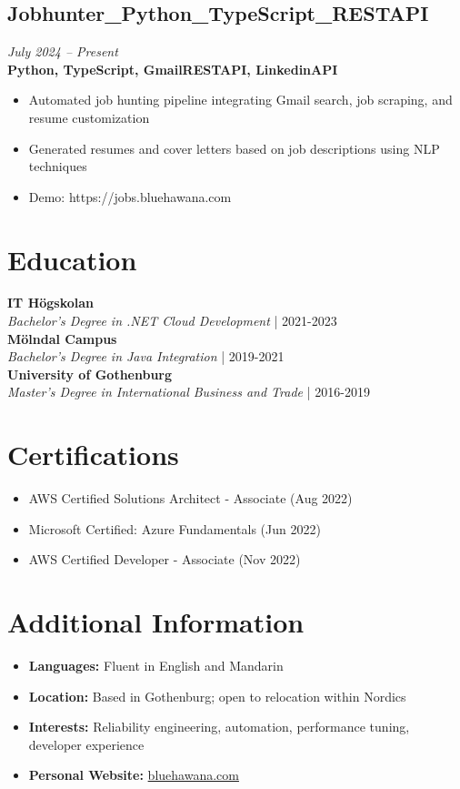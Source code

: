 \documentclass[11pt,a4paper]{article}
\begin{document}
\subsection{Jobhunter\_Python\_TypeScript\_RESTAPI}
\textit{July 2024 -- Present} \\
\textbf{Python, TypeScript, GmailRESTAPI, LinkedinAPI}
\begin{itemize}
\item Automated job hunting pipeline integrating Gmail search, job scraping, and resume customization
\item Generated resumes and cover letters based on job descriptions using NLP techniques
\item Demo: https://jobs.bluehawana.com
\end{itemize}


\section*{Education}
\textbf{IT Högskolan}\\
\textit{Bachelor's Degree in .NET Cloud Development} | 2021-2023\\
\textbf{Mölndal Campus}\\
\textit{Bachelor's Degree in Java Integration} | 2019-2021\\
\textbf{University of Gothenburg}\\
\textit{Master's Degree in International Business and Trade} | 2016-2019\\

\section*{Certifications}
\begin{itemize}
\item AWS Certified Solutions Architect - Associate (Aug 2022)
\item Microsoft Certified: Azure Fundamentals (Jun 2022)
\item AWS Certified Developer - Associate (Nov 2022)
\end{itemize}

\section*{Additional Information}
\begin{itemize}
\item \textbf{Languages:} Fluent in English and Mandarin
\item \textbf{Location:} Based in Gothenburg; open to relocation within Nordics
\item \textbf{Interests:} Reliability engineering, automation, performance tuning, developer experience
\item \textbf{Personal Website:} \href{https://www.bluehawana.com}{bluehawana.com}
\end{itemize}
\end{document}

